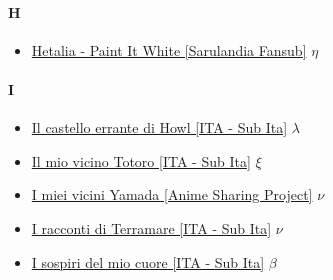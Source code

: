 		\paragraph{H} \hypertarget{FH}{}
			\begin{itemize}
			
				\item \href{https://mega.nz/#!9VcBjAoS!xwF1FRV60OIT4gDheeYbgvHSkJNrxkqN9XVME4ZukIo} {Hetalia - Paint It White [Sarulandia Fansub]}  $\eta$   \\
			
		\end{itemize}	
		
		\paragraph{I} \hypertarget{FI}{}
			\begin{itemize}
				
				\item \href{https://mega.nz/#!CohVFQDQ!By0Zn8JcQAud5qFvUHQxJOwWHJISrFsJLMSyZZlgruA} {Il castello errante di Howl [ITA - Sub Ita]}  $\lambda$   \\
				\item \href{https://mega.nz/#!7oBS1TJY!BuWoBZ54nKjdTxPiBiMNkJRIMaaaFdY48C_oKXnSppg} {Il mio vicino Totoro [ITA - Sub Ita]}  $\xi$   \\
				\item \href{https://mega.nz/#F!vk9RkbBT!QoN4AdUDw6IU3QGhUxa57w} {I miei vicini Yamada [Anime Sharing Project]}  $\nu$   \\
				\item \href{https://mega.nz/#F!T95lAKZa!Mmlmt02xMPEY1tVeD9Vqiw} {I racconti di Terramare [ITA - Sub Ita]}  $\nu$   \\
				\item \href{https://mega.nz/#F!T95lAKZa!Mmlmt02xMPEY1tVeD9Vqiw} {I sospiri del mio cuore [ITA - Sub Ita]}  $\beta$   \\
				
			\end{itemize}
		
